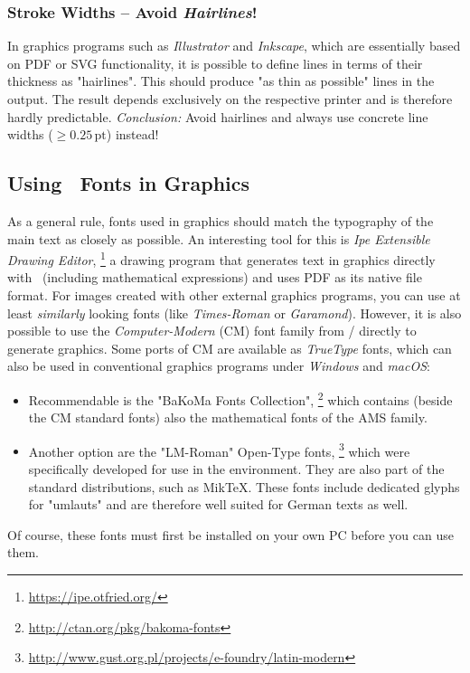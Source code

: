 \subsubsection{Stroke Widths -- Avoid \emph{Hairlines}!}

In graphics programs such as \emph{Illustrator} and \emph{Inkscape}, which
are essentially based on PDF or SVG functionality, it is possible to define
lines in terms of their thickness as "hairlines". This should produce "as
thin as possible" lines in the output. The result depends exclusively on the
respective printer and is therefore hardly predictable. \emph{Conclusion:}
Avoid hairlines and always use concrete line widths ($\geq 0.25\,
\mathrm{pt}$) instead!

\subsection{Using \tex\ Fonts in Graphics}
\label{sec:TexFontsInGraphics}

As a general rule, fonts used in graphics should match the typography of the
main text as closely as possible. An interesting tool for this is \emph{Ipe
Extensible Drawing Editor},%
\footnote{\url{https://ipe.otfried.org/}}
a drawing program that generates text in graphics directly with \latex\
(including mathematical expressions) and uses PDF as its native file format.
For images created with other external graphics programs, you can use at
least \emph{similarly} looking fonts (like \emph{Times-Roman} or
\emph{Garamond}). However, it is also possible to use the
\emph{Computer-Modern} (CM) font family from {\tex}/{\latex} directly to
generate graphics. Some ports of CM are available as \emph{TrueType} fonts,
which can also be used in conventional graphics programs under \emph{Windows}
and \emph{macOS}:
%
\begin{itemize}
    \item
    Recommendable is the "BaKoMa Fonts Collection",%
    \footnote{\url{http://ctan.org/pkg/bakoma-fonts}}
    which contains (beside the CM standard fonts) also the mathematical fonts
    of the
    AMS family.
    \item
    Another option are the "LM-Roman" Open-Type fonts,%
    \footnote{\url{http://www.gust.org.pl/projects/e-foundry/latin-modern}}
    which were specifically developed for use in the \latex environment.
    They are also part of the standard \latex distributions, such as MikTeX.
    These fonts include dedicated glyphs for "umlauts" and are therefore well
    suited for German texts as well.
\end{itemize}
%
Of course, these fonts must first be installed on your own PC before you can
use them.

